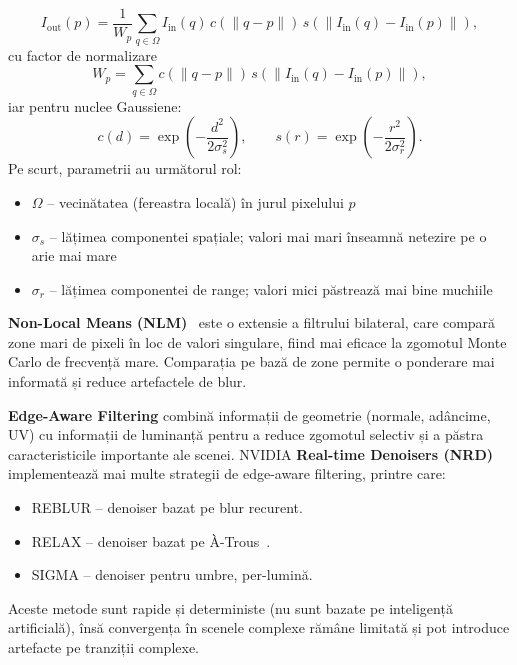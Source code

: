\documentclass[12pt,a4paper]{report}
\numberwithin{equation}{section} %
\begin{document}
\begin{equation}
	I_{\text{out}}(p) = \frac{1}{W_p} \sum_{q \in \Omega} I_{\text{in}}(q)\,c(\|q-p\|)\,s(\|I_{\text{in}}(q)-I_{\text{in}}(p)\|),
\end{equation}
cu factor de normalizare
\begin{equation}
	W_p = \sum_{q \in \Omega} c(\|q-p\|)\,s(\|I_{\text{in}}(q)-I_{\text{in}}(p)\|),
\end{equation}
iar pentru nuclee Gaussiene:
\begin{equation}
	c(d)=\exp\left(-\frac{d^2}{2\sigma_s^2}\right), \qquad
	s(r)=\exp\left(-\frac{r^2}{2\sigma_r^2}\right).
\end{equation}
Pe scurt, parametrii au următorul rol:
\begin{itemize}
	\item $\Omega$ -- vecinătatea (fereastra locală) în jurul pixelului $p$
	\item $\sigma_s$ -- lățimea componentei spațiale; valori mai mari înseamnă netezire pe o arie mai mare
	\item $\sigma_r$ -- lățimea componentei de range; valori mici păstrează mai bine muchiile
\end{itemize}

\textbf{Non-Local Means (NLM)}~\cite{BcmNlm} este o extensie a filtrului bilateral, care compară zone mari de pixeli în loc de valori singulare, fiind mai eficace la zgomotul Monte Carlo de frecvență mare.
Comparația pe bază de zone permite o ponderare mai informată și reduce artefactele de blur.

\textbf{Edge-Aware Filtering} combină informații de geometrie (normale, adâncime, UV) cu informații de luminanță pentru a reduce zgomotul selectiv și a păstra caracteristicile importante ale scenei.
NVIDIA \textbf{Real-time Denoisers (NRD)} implementează mai multe strategii de edge-aware filtering, printre care:
\begin{itemize}
	\item REBLUR -- denoiser bazat pe blur recurent.
	\item RELAX -- denoiser bazat pe \`A-Trous~\cite{dammertz2010edge}.
	\item SIGMA -- denoiser pentru umbre, per-lumină.
\end{itemize}

Aceste metode sunt rapide și deterministe (nu sunt bazate pe inteligență artificială), însă convergența în scenele complexe rămâne limitată și pot introduce artefacte pe tranziții complexe.
\end{document}
